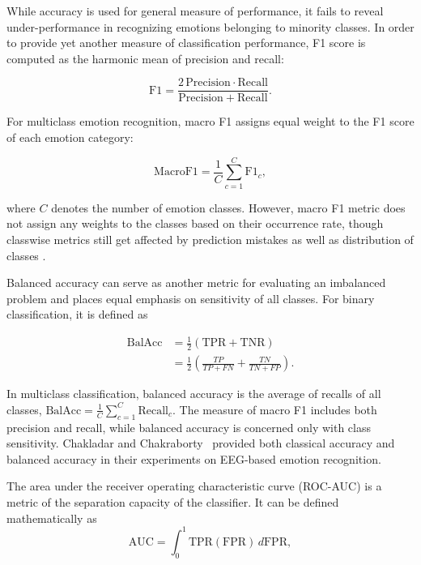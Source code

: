 \documentclass[ASNA,twocolumn]{USG}
\begin{document}
While accuracy is used for general measure of performance, it fails to reveal under-performance in recognizing emotions belonging to minority classes. In order to provide yet another measure of classification performance, F1 score is computed as the harmonic mean of precision and recall:

\begin{equation}
\mathrm{F1} =
\frac{2\,\mathrm{Precision}\cdot\mathrm{Recall}}
{\mathrm{Precision}+\mathrm{Recall}}.
\label{eq:f1}
\end{equation}

For multiclass emotion recognition, macro F1 assigns equal weight to the F1 score of each emotion category:

\begin{equation}
\mathrm{MacroF1} =
\frac{1}{C}\sum_{c=1}^{C}\mathrm{F1}_c,
\label{eq:macro_f1}
\end{equation}

where $C$ denotes the number of emotion classes. However, macro F1 metric does not assign any weights to the classes based on their occurrence rate, though classwise metrics still get affected by prediction mistakes as well as distribution of classes \cite{kukhilava2025evaluation}.

Balanced accuracy can serve as another metric for evaluating an imbalanced problem and places equal emphasis on sensitivity of all classes. For binary classification, it is defined as

\begin{equation}
\begin{aligned}
\mathrm{BalAcc}
&=\frac{1}{2}(\mathrm{TPR}+\mathrm{TNR})\\[3pt]
&=\frac{1}{2}
\left(
\frac{TP}{TP+FN}
+
\frac{TN}{TN+FP}
\right).
\end{aligned}
\label{eq:balacc}
\end{equation}

In multiclass classification, balanced accuracy is the average of recalls of all classes, $\mathrm{BalAcc}=\frac{1}{C}\sum_{c=1}^{C}\mathrm{Recall}_c$. The measure of macro F1 includes both precision and recall, while balanced accuracy is concerned only with class sensitivity. Chakladar and Chakraborty~\cite{chakladar2018eeg} provided both classical accuracy and balanced accuracy in their experiments on EEG-based emotion recognition.

The area under the receiver operating characteristic curve (ROC-AUC) is a metric of the separation capacity of the classifier. It can be defined mathematically as
\begin{equation}
\mathrm{AUC} =
\int_{0}^{1}
\mathrm{TPR}(\mathrm{FPR})\,d\mathrm{FPR},
\label{eq:auc}
\end{equation}
\end{document}
